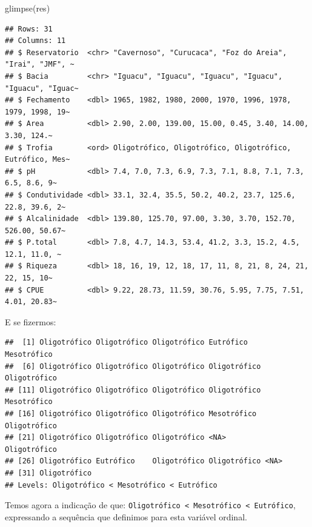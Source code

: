 \documentclass[
]{book}
\newenvironment{Shaded}{\begin{snugshade}}{\end{snugshade}}
\newcommand{\FunctionTok}[1]{\textcolor[rgb]{0.00,0.00,0.00}{#1}}
\newcommand{\NormalTok}[1]{#1}
\newcommand{\SpecialCharTok}[1]{\textcolor[rgb]{0.00,0.00,0.00}{#1}}
\begin{document}
\begin{Shaded}
\begin{Highlighting}[]
\FunctionTok{glimpse}\NormalTok{(res)}
\end{Highlighting}
\end{Shaded}

\begin{verbatim}
## Rows: 31
## Columns: 11
## $ Reservatorio  <chr> "Cavernoso", "Curucaca", "Foz do Areia", "Irai", "JMF", ~
## $ Bacia         <chr> "Iguacu", "Iguacu", "Iguacu", "Iguacu", "Iguacu", "Iguac~
## $ Fechamento    <dbl> 1965, 1982, 1980, 2000, 1970, 1996, 1978, 1979, 1998, 19~
## $ Area          <dbl> 2.90, 2.00, 139.00, 15.00, 0.45, 3.40, 14.00, 3.30, 124.~
## $ Trofia        <ord> Oligotrófico, Oligotrófico, Oligotrófico, Eutrófico, Mes~
## $ pH            <dbl> 7.4, 7.0, 7.3, 6.9, 7.3, 7.1, 8.8, 7.1, 7.3, 6.5, 8.6, 9~
## $ Condutividade <dbl> 33.1, 32.4, 35.5, 50.2, 40.2, 23.7, 125.6, 22.8, 39.6, 2~
## $ Alcalinidade  <dbl> 139.80, 125.70, 97.00, 3.30, 3.70, 152.70, 526.00, 50.67~
## $ P.total       <dbl> 7.8, 4.7, 14.3, 53.4, 41.2, 3.3, 15.2, 4.5, 12.1, 11.0, ~
## $ Riqueza       <dbl> 18, 16, 19, 12, 18, 17, 11, 8, 21, 8, 24, 21, 22, 15, 10~
## $ CPUE          <dbl> 9.22, 28.73, 11.59, 30.76, 5.95, 7.75, 7.51, 4.01, 20.83~
\end{verbatim}

E se fizermos:

\begin{Shaded}
\end{Shaded}

\begin{verbatim}
##  [1] Oligotrófico Oligotrófico Oligotrófico Eutrófico    Mesotrófico 
##  [6] Oligotrófico Oligotrófico Oligotrófico Oligotrófico Oligotrófico
## [11] Oligotrófico Oligotrófico Oligotrófico Oligotrófico Mesotrófico 
## [16] Oligotrófico Oligotrófico Oligotrófico Mesotrófico  Oligotrófico
## [21] Oligotrófico Oligotrófico Oligotrófico <NA>         Oligotrófico
## [26] Oligotrófico Eutrófico    Oligotrófico Oligotrófico <NA>        
## [31] Oligotrófico
## Levels: Oligotrófico < Mesotrófico < Eutrófico
\end{verbatim}

Temos agora a indicação de que: \texttt{Oligotrófico\ \textless{}\ Mesotrófico\ \textless{}\ Eutrófico}, expressando a sequência que definimos para esta variável ordinal.
\end{document}
